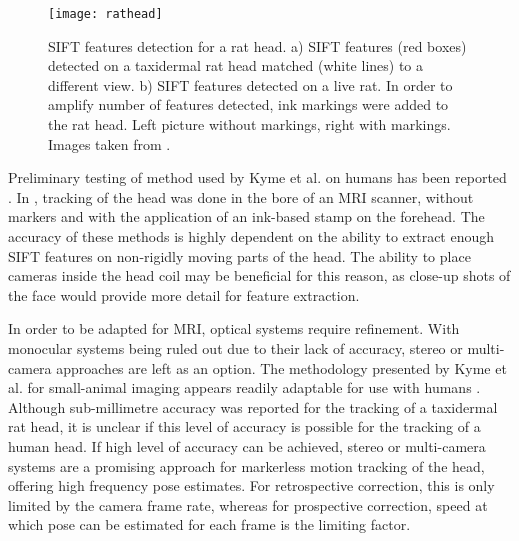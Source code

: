 \documentclass[class=article, crop=false]{standalone}
\begin{document}
\begin{figure}
	\centering
	\texttt{[image: rathead]}
	\caption{SIFT features detection for a rat head. a) SIFT features (red boxes) detected on a taxidermal rat head matched (white lines) to a different view. b) SIFT features detected on a live rat. In order to amplify number of features detected, ink markings were added to the rat head. Left picture without markings, right with markings. Images taken from \parencite{Kyme2014}.}
	\label{rathead}
\end{figure}

\par 
Preliminary testing of method used by Kyme et al. \parencite*{Kyme2014} on humans has been reported \parencite{Kyme2016,Kyme2013}. In \cite{Kyme2016}, tracking of the head was done in the bore of an MRI scanner, without markers and with the application of an ink-based stamp on the forehead. The accuracy of these methods is highly dependent on the ability to extract enough SIFT features on non-rigidly moving parts of the head. The ability to place cameras inside the head coil may be beneficial for this reason, as close-up shots of the face would provide more detail for feature extraction.
\par 
In order to be adapted for MRI, optical systems require refinement. With monocular systems being ruled out due to their lack of accuracy, stereo or multi-camera approaches are left as an option. The methodology presented by Kyme et al. \parencite*{Kyme2014} for small-animal imaging appears readily adaptable for use with humans \parencite{Kyme2016,Kyme2013}. Although sub-millimetre accuracy was reported for the tracking of a taxidermal rat head, it is unclear if this level of accuracy is possible for the tracking of a human head. If high level of accuracy can be achieved, stereo or multi-camera systems are a promising approach for markerless motion tracking of the head, offering high frequency pose estimates. For retrospective correction, this is only limited by the camera frame rate, whereas for prospective correction, speed at which pose can be estimated for each frame is the limiting factor.
\end{document}
